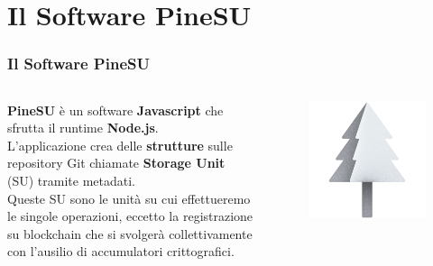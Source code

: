 \documentclass{beamer}
\begin{document}
\section{Il Software PineSU}
\begin{frame}
	\frametitle{Il Software PineSU}
	\begin{columns}
		\textbf{PineSU} è un software \textbf{Javascript} che sfrutta il runtime \textbf{Node.js}. \\
		\smallskip
		L'applicazione crea delle \textbf{strutture} sulle repository Git chiamate
		\textbf{Storage Unit} (SU) tramite metadati. \\
		\smallskip
		Queste SU sono le unità su cui effettueremo le singole
		operazioni, eccetto la registrazione su blockchain che si svolgerà
		collettivamente con l'ausilio di accumulatori crittografici. 
		\centering
		\begin{figure}
			\includegraphics[width=\textwidth]{figures/favicon.png}
		\end{figure} 
	\end{columns}
\end{frame}
\end{document}
